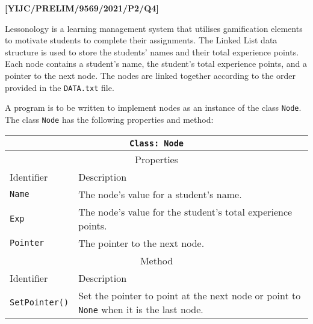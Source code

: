 \item \textbf{{[}YIJC/PRELIM/9569/2021/P2/Q4{]} }

Lessonology is a learning management system that utilises gamification
elements to motivate students to complete their assignments. The Linked
List data structure is used to store the students\textquoteright{}
names and their total experience points. Each node contains a student\textquoteright s
name, the student\textquoteright s total experience points, and a
pointer to the next node. The nodes are linked together according
to the order provided in the \texttt{DATA.txt} file. 

A program is to be written to implement nodes as an instance of the
class \texttt{Node}. The class \texttt{Node} has the following properties
and method: 
\begin{center}
\begin{tabular}{|l|l|}
\hline 
\multicolumn{2}{|c|}{\texttt{Class: Node}}\tabularnewline
\hline 
\multicolumn{2}{|c|}{Properties}\tabularnewline
\hline 
\texttt{\hspace{0.01\columnwidth}}Identifier & \texttt{\hspace{0.05\columnwidth}}Description\tabularnewline
\hline 
\texttt{Name} & The node\textquoteright s value for a student\textquoteright s name.\tabularnewline
\hline 
\texttt{Exp} & The node\textquoteright s value for the student\textquoteright s total
experience points.\tabularnewline
\hline 
\texttt{Pointer} & The pointer to the next node.\tabularnewline
\hline 
\multicolumn{2}{|c|}{Method}\tabularnewline
\hline 
\texttt{\hspace{0.01\columnwidth}}Identifier & \texttt{\hspace{0.05\columnwidth}}Description\tabularnewline
\hline 
\texttt{SetPointer()} & Set the pointer to point at the next node or point to \texttt{None}
when it is the last node.\tabularnewline
\hline 
\end{tabular}
\par\end{center}

